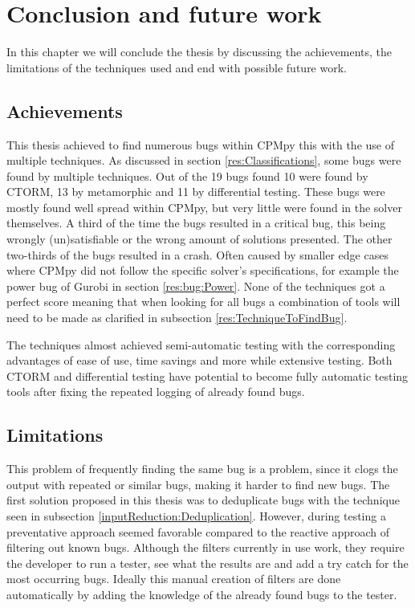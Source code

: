 \chapter{Conclusion and future work}
\label{cha:7:conclusion}
\label{con:intro}
In this chapter we will conclude the thesis by discussing the achievements, the limitations of the techniques used and end with possible future work.

\section{Achievements}
\label{con:Achievements}
This thesis achieved to find numerous bugs within CPMpy this with the use of multiple techniques. As discussed in section \ref{res:Classifications}, some bugs were found by multiple techniques. Out of the 19 bugs found 10 were found by CTORM, 13 by metamorphic and 11 by differential testing. These bugs were mostly found well spread within CPMpy, but very little were found in the solver themselves. A third of the time the bugs resulted in a critical bug, this being wrongly (un)satisfiable or the wrong amount of solutions presented. The other two-thirds of the bugs resulted in a crash. Often caused by smaller edge cases where CPMpy did not follow the specific solver's specifications, for example the power bug of Gurobi in section \ref{res:bug:Power}. None of the techniques got a perfect score meaning that when looking for all bugs a combination of tools will need to be made as clarified in subsection \ref{res:TechniqueToFindBug}.

The techniques almost achieved semi-automatic testing with the corresponding advantages of ease of use, time savings and more while extensive testing. Both CTORM and differential testing have potential to become fully automatic testing tools after fixing the repeated logging of already found bugs.


\section{Limitations}
\label{con:Limitations}
This problem of frequently finding the same bug is a problem, since it clogs the output with repeated or similar bugs, making it harder to find new bugs. The first solution proposed in this thesis was to deduplicate bugs with the technique seen in subsection \ref{inputReduction:Deduplication}. However, during testing a preventative approach seemed  favorable compared to the reactive approach of filtering out known bugs. Although the filters currently in use work, they require the developer to run a tester, see what the results are and add a try catch for the most occurring bugs. Ideally this manual creation of filters are done automatically by adding the knowledge of the already found bugs to the tester. 

